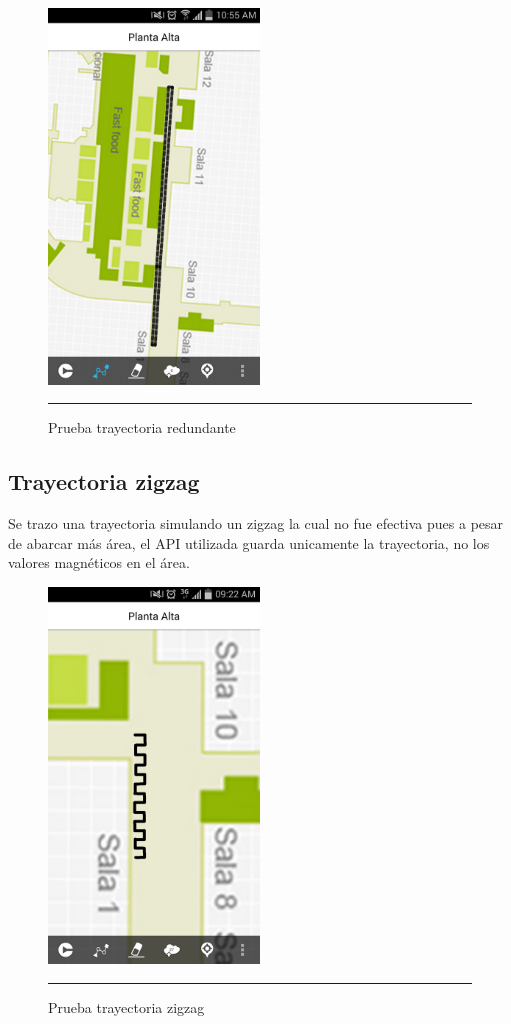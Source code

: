 \begin{figure}[h]
	\centering
		\includegraphics[width=0.5\textwidth]{Figuras/redundante.png}
		\rule{30em}{0.5pt}
	\caption[Prueba trayectoria redundante]{Prueba trayectoria redundante}
	\label{fig:vistaPruebaRedundante}
\end{figure}
\clearpage

\subsection{Trayectoria zigzag}
Se trazo una trayectoria simulando un zigzag la cual no fue efectiva pues a pesar de abarcar más área, el API utilizada guarda unicamente 
la trayectoria, no los valores magnéticos en el área.
\begin{figure}[h]
	\centering
		\includegraphics[width=0.5\textwidth]{Figuras/zigzag.png}
		\rule{30em}{0.5pt}
	\caption[Prueba trayectoria zigzag]{Prueba trayectoria zigzag}
	\label{fig:vistaPruebaZig}
\end{figure}
\clearpage

